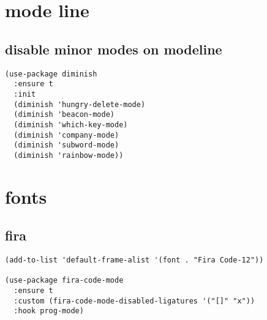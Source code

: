 \documentclass[11pt]{article}
\begin{document}
\section{mode line}
\label{sec:org2f5f7c3}
\subsection{disable minor modes on modeline}
\label{sec:org3542801}
\begin{verbatim}
(use-package diminish
  :ensure t
  :init
  (diminish 'hungry-delete-mode)
  (diminish 'beacon-mode)
  (diminish 'which-key-mode)
  (diminish 'company-mode)
  (diminish 'subword-mode)
  (diminish 'rainbow-mode))
\end{verbatim}
\section{fonts}
\label{sec:orgf4628e7}
\subsection{fira}
\label{sec:org45211e7}
\begin{verbatim}
(add-to-list 'default-frame-alist '(font . "Fira Code-12"))

(use-package fira-code-mode
  :ensure t
  :custom (fira-code-mode-disabled-ligatures '("[]" "x"))
  :hook prog-mode)

\end{verbatim}
\end{document}
